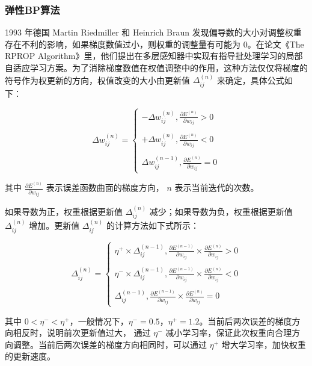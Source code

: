 \documentclass[UTF8]{ctexart}
\begin{document}
\subsubsection{弹性BP算法}

1993 年德国 Martin  Riedmiller 和 Heinrich  Braun 发现偏导数的大小对调整权重存在不利的影响，如果梯度数值过小，则权重的调整量有可能为 $0$。在论文《The RPROP Algorithm》里，他们提出在多层感知器中实现有指导批处理学习的局部自适应学习方案。为了消除梯度数值在权值调整中的作用，这种方法仅仅将梯度的符号作为权更新的方向，权值改变的大小由更新值 $\Delta_{ij}^{(n)}$ 来确定，具体公式如下：

\begin{equation}
\Delta w_{ij}^{(n)}=\begin{cases}
-\Delta w_{ij}^{(n)},\frac{\partial E^{(n)}}{\partial w_{ij}} > 0 \\ \\ 
+\Delta w_{ij}^{(n)},\frac{\partial E^{(n)}}{\partial w_{ij}} < 0 \\ \\
\Delta w_{ij}^{(n-1)},\frac{\partial E^{(n)}}{\partial w_{ij}} = 0
\end{cases}
\end{equation}

其中 $\frac{\partial E^{(n)}}{\partial w_{ij}}$ 表示误差函数曲面的梯度方向， $n$ 表示当前迭代的次数。 \par

如果导数为正，权重根据更新值 $\Delta_{ij}^{(n)}$ 减少；如果导数为负，权重根据更新值 $\Delta_{ij}^{(n)}$ 增加。更新值 $\Delta_{ij}^{(n)}$ 的计算方法如下式所示：  \par

\begin{equation}
\Delta_{ij}^{(n)}=\begin{cases}
\eta^{+} \times \Delta_{ij}^{(n - 1)}, \frac{\partial E^{(n-1)}}{\partial w_{ij}} \times \frac{\partial E^{(n)}}{\partial w_{ij}} > 0 \\ \\
\eta^{-} \times \Delta_{ij}^{(n - 1)}, \frac{\partial E^{(n-1)}}{\partial w_{ij}} \times \frac{\partial E^{(n)}}{\partial w_{ij}} < 0 \\ \\
\Delta_{ij}^{(n - 1)}, \frac{\partial E^{(n-1)}}{\partial w_{ij}} \times \frac{\partial E^{(n)}}{\partial w_{ij}} = 0
\end{cases}
\end{equation}

其中 $0 < \eta^{-} < \eta^{+}$，一般情况下，$\eta^{-} = 0.5$，$\eta^{+} = 1.2$。当前后两次误差的梯度方向相反时，说明前次更新值过大， 通过 $\eta^{-}$ 减小学习率，保证此次权重向合理方向调整。当前后两次误差的梯度方向相同时，可以通过 $\eta^{+}$ 增大学习率，加快权重的更新速度。 \par
\end{document}
